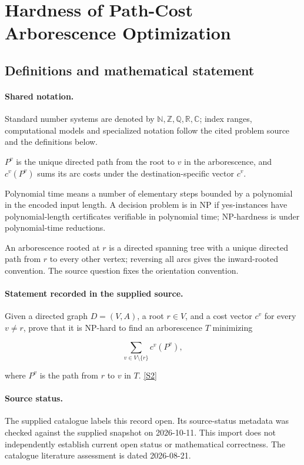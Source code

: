 \documentclass[11pt]{article}
\newcommand{\sref}[2]{\hyperlink{source:#1:#2}{[S#2]}}
\begin{document}
\section{Hardness of Path-Cost Arborescence Optimization}\label{statement}

\subsection{Definitions and mathematical statement}

\paragraph{Shared notation.}Standard number systems are denoted by $\mathbb N,\mathbb Z,\mathbb Q,\mathbb R,\mathbb C$; index ranges, computational models and specialized notation follow the cited problem source and the definitions below.


$P^v$ is the unique directed path from the root to $v$ in the arborescence, and $c^v(P^v)$ sums its arc costs under the destination-specific vector $c^v$.

Polynomial time means a number of elementary steps bounded by a polynomial in the encoded input length. A decision problem is in $\mathrm{NP}$ if yes-instances have polynomial-length certificates verifiable in polynomial time; NP-hardness is under polynomial-time reductions.

An arborescence rooted at $r$ is a directed spanning tree with a unique directed path from $r$ to every other vertex; reversing all arcs gives the inward-rooted convention. The source question fixes the orientation convention.
\paragraph{Statement recorded in the supplied source.}
Given a directed graph $D=(V,A)$, a root $r\in V$, and a cost vector $c^v$ for every $v\neq r$, prove that it is NP-hard to find an arborescence $T$ minimizing

$$\sum_{v\in V\setminus\{r\}}c^v(P^v),$$

where $P^v$ is the path from $r$ to $v$ in $T$. \sref{statement}{2}
\paragraph{Source status.}
The supplied catalogue labels this record open. Its source-status metadata was checked against the supplied snapshot on 2026-10-11. This import does not independently establish current open status or mathematical correctness. The catalogue literature assessment is dated 2026-08-21.
\end{document}
